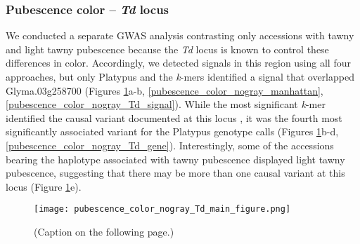 \subsubsection*{Pubescence color -- \textit{Td} locus}
\label{sv-gwas-main-results-pubescence-color-td}

We conducted a separate GWAS analysis contrasting only accessions with tawny and light
tawny pubescence because the \textit{Td} locus is known to control
these differences in color. Accordingly, we
detected signals in this region using all four approaches, but only Platypus
and the \textit{k}-mers identified a signal that overlapped Glyma.03g258700
(Figures \ref{pubescence-color-main-figure}a-b,
\ref{pubescence_color_nogray_manhattan}, \ref{pubescence_color_nogray_Td_signal}).
While the most significant \textit{k}-mer identified the causal variant documented
at this locus \citep{yan2020}, it was the fourth most significantly associated variant
for the Platypus genotype calls (Figures
\ref{pubescence-color-main-figure}b-d, \ref{pubescence_color_nogray_Td_gene}).
Interestingly, some of the accessions bearing the haplotype associated with tawny pubescence
displayed light tawny pubescence, suggesting that there may be more than one causal
variant at this locus (Figure \ref{pubescence-color-main-figure}e).

\begin{figure}
	\centering
	\texttt{[image: pubescence\_color\_nogray\_Td\_main\_figure.png]}
	\caption[Results of SNP/indel- and \textit{k}-mer-based GWAS at the
	\textit{Td} locus for pubescence color]{(Caption on the following page.)}
	\label{pubescence-color-main-figure}
\end{figure}


